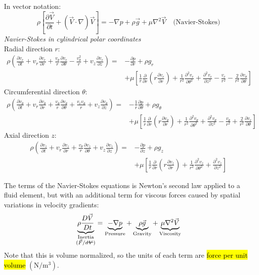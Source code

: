 ﻿\documentclass[12pt]{article}
\newcommand{\vol}{\mathord{\text{\ooalign{\hidewidth $V$\hidewidth\cr\kern-0.5pt\raisebox{0.8ex}{\rule[0pt]{1em}{0.5pt}}}}}}
\begin{document}
In vector notation:
\[
\boxed{\rho\left[\frac{\partial\vec V}{\partial t}+(\vec V\cdot\nabla)\vec V\right]=-\nabla p+\rho\vec g+\mu\nabla^2\vec V\quad \text{(Navier-Stokes)}}
\]
\textit{Navier-Stokes in cylindrical polar coordinates}\\
Radial direction $r$:
\[
\boxed{\begin{aligned}
\rho\left(\frac{\partial v_r}{\partial t}+v_r\frac{\partial v_r}{\partial r}+\frac{v_\theta}{r}\frac{\partial v_r}{\partial\theta}-\frac{v_\theta^2}{r}+v_z\frac{\partial v_r}{\partial z}\right)
={}&-\frac{\partial p}{\partial r}+\rho g_r\\
&+\mu\left[\frac1r\frac{\partial}{\partial r}\left(r\frac{\partial v_r}{\partial r}\right)+\frac1{r^2}\frac{\partial^2v_r}{\partial\theta^2}+\frac{\partial^2v_r}{\partial z^2}-\frac{v_r}{r^2}-\frac2{r^2}\frac{\partial v_\theta}{\partial\theta}\right]
\end{aligned}}
\]
Circumferential direction \(\theta\):
\[\boxed{
\begin{aligned}
\rho\left(\frac{\partial v_\theta}{\partial t}+v_r\frac{\partial v_\theta}{\partial r}+\frac{v_\theta}{r}\frac{\partial v_\theta}{\partial\theta}+\frac{v_rv_\theta}{r}+v_z\frac{\partial v_\theta}{\partial z}\right)
={}&-\frac1r\frac{\partial p}{\partial\theta}+\rho g_\theta\\
&+\mu\left[\frac1r\frac{\partial}{\partial r}\left(r\frac{\partial v_\theta}{\partial r}\right)+\frac1{r^2}\frac{\partial^2v_\theta}{\partial\theta^2}+\frac{\partial^2v_\theta}{\partial z^2}-\frac{v_\theta}{r^2}+\frac2{r^2}\frac{\partial v_r}{\partial\theta}\right]
\end{aligned}}
\]
Axial direction $z$:
\[\boxed{
\begin{aligned}
\rho\left(\frac{\partial v_z}{\partial t}+v_r\frac{\partial v_z}{\partial r}+\frac{v_\theta}{r}\frac{\partial v_z}{\partial\theta}+v_z\frac{\partial v_z}{\partial z}\right)
={}&-\frac{\partial p}{\partial z}+\rho g_z\\
&+\mu\left[\frac1r\frac{\partial}{\partial r}\left(r\frac{\partial v_z}{\partial r}\right)+\frac1{r^2}\frac{\partial^2v_z}{\partial\theta^2}+\frac{\partial^2v_z}{\partial z^2}\right]
\end{aligned}}
\]
\begin{notebox}
    The terms of the Navier-Stokes equations is Newton's second law applied to a fluid element, but with an additional term for viscous forces caused by spatial variations in velocity gradients:
\[
\underbrace{\rho\frac{D\vec{V}}{Dt}}_{\substack{\text{Inertia}\\(\vec F/d\vol)}}
=
\underbrace{-\nabla p}_{\text{Pressure}}
+
\underbrace{\rho\vec{g}}_{\text{Gravity}}
+
\underbrace{\mu\nabla^2\vec{V}}_{\text{Viscosity}}
\]
Note that this is volume normalized, so the units of each term are \hl{force per unit volume} \((\mathrm{N/m^3})\).
\end{notebox}
\end{document}
